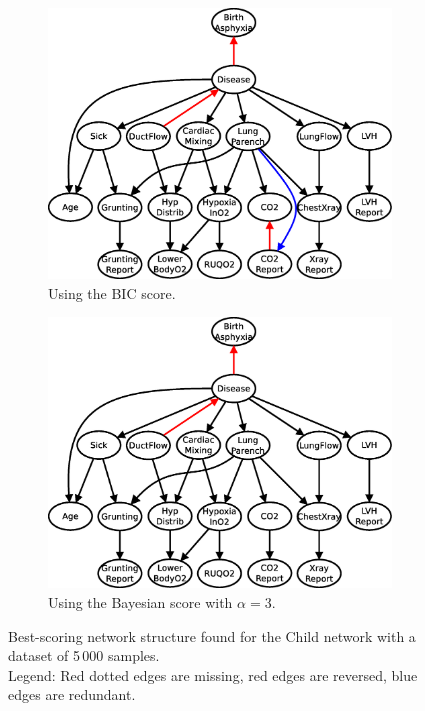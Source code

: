 \documentclass[english,cover]{fitthesis} %
\begin{document}
\begin{figure}[ht]
    \centering
    \begin{subfigure}[b]{0.45\linewidth}
        \hspace{-1.4cm}
        \includegraphics[scale=0.35]{fig/structure-learning-child-5000-bic}
        \caption{Using the BIC score.}
        \label{fig:structure-learning-child-5000-bic}
    \end{subfigure}
    \begin{subfigure}[b]{0.45\linewidth}
        \hspace{0.4cm}
        \includegraphics[scale=0.35]{fig/structure-learning-child-5000-bayes-3_0}
        \caption{Using the Bayesian score with $\alpha = 3$.}
        \label{fig:structure-learning-child-5000-bayes-3_0}
    \end{subfigure}
    \caption{Best-scoring network structure found for the Child network with a dataset of 5\,000 samples.
    \\Legend: Red dotted edges are missing, red edges are reversed, blue edges are redundant.}
\end{figure}
\end{document}
